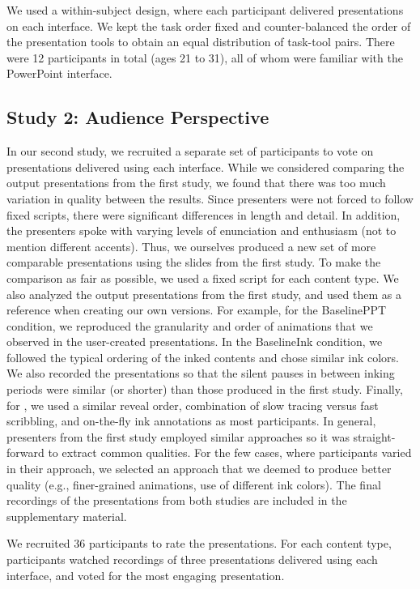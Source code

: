 We used a within-subject design, where each participant delivered presentations on each interface. We kept the task order fixed and counter-balanced the order of the presentation tools to obtain an equal distribution of task-tool pairs.
%
There were 12 participants in total (ages 21 to 31), all of whom were familiar with the PowerPoint interface. 

\subsection{Study 2: Audience Perspective}
In our second study, we recruited a separate set of participants to vote on presentations delivered using each interface.
%
While we considered comparing the output presentations from the first study, we found that there was too much variation in quality between the results. Since presenters were not forced to follow fixed scripts, there were significant differences in length and detail. In addition, the presenters spoke with varying levels of enunciation and enthusiasm (not to mention different accents).
%
Thus, we ourselves produced a new set of more comparable presentations
using the slides from the first study.
%
To make the comparison as fair as possible, we used a fixed script for each content type.
We also analyzed the output presentations from the first study, and used them as a reference when creating our own versions. 
%
For example, for the BaselinePPT condition, we reproduced the granularity and order of animations that we observed in the user-created presentations.
In the BaselineInk condition, we followed the typical ordering of the inked contents and chose similar ink colors. We also recorded the presentations so that the silent pauses in between inking periods were similar (or shorter) than those produced in the first study. 
%
Finally, for \interface, we used a similar reveal order, combination of slow tracing versus fast scribbling, and on-the-fly ink annotations as most participants. 
%
In general, presenters from the first study employed similar approaches so it was straight-forward to extract common qualities. For the few cases, where participants varied in their approach, we selected an approach that we deemed to produce better quality (e.g., finer-grained animations, use of different ink colors). The final recordings of the presentations from both studies are included in the supplementary material. 

We recruited 36 participants to rate the presentations. For each content type, participants watched recordings of three presentations delivered using each interface, and voted for the most engaging presentation. 















